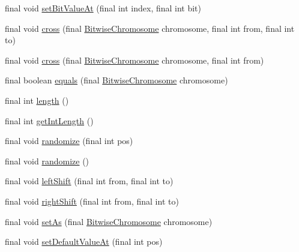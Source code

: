 \begin{DoxyCompactItemize}
\item 
final void \hyperlink{classjenes_1_1chromosome_1_1_bitwise_chromosome_a2e746b511933914d4be452573ac5ab7c}{set\-Bit\-Value\-At} (final int index, final int bit)
\item 
final void \hyperlink{classjenes_1_1chromosome_1_1_bitwise_chromosome_a2d711baa2a74ccb064d33ef73edbd464}{cross} (final \hyperlink{classjenes_1_1chromosome_1_1_bitwise_chromosome}{Bitwise\-Chromosome} chromosome, final int from, final int to)
\item 
final void \hyperlink{classjenes_1_1chromosome_1_1_bitwise_chromosome_a933b1991999fa3b586c1739744751725}{cross} (final \hyperlink{classjenes_1_1chromosome_1_1_bitwise_chromosome}{Bitwise\-Chromosome} chromosome, final int from)
\item 
final boolean \hyperlink{classjenes_1_1chromosome_1_1_bitwise_chromosome_a41c9858f7ef05194011d1e227fea3584}{equals} (final \hyperlink{classjenes_1_1chromosome_1_1_bitwise_chromosome}{Bitwise\-Chromosome} chromosome)
\item 
final int \hyperlink{classjenes_1_1chromosome_1_1_bitwise_chromosome_a0da8899c89f8b1f222526acf1d2e8519}{length} ()
\item 
final int \hyperlink{classjenes_1_1chromosome_1_1_bitwise_chromosome_a5878e8d0ace81cfb617f75109c02855d}{get\-Int\-Length} ()
\item 
final void \hyperlink{classjenes_1_1chromosome_1_1_bitwise_chromosome_a1a79d4c9c671d2f735d57d64c59dfdb8}{randomize} (final int pos)
\item 
final void \hyperlink{classjenes_1_1chromosome_1_1_bitwise_chromosome_a8028fde93528b7b51313f6c311b2b640}{randomize} ()
\item 
final void \hyperlink{classjenes_1_1chromosome_1_1_bitwise_chromosome_ab02c791be30c931cae793289185e459f}{left\-Shift} (final int from, final int to)
\item 
final void \hyperlink{classjenes_1_1chromosome_1_1_bitwise_chromosome_afb689c4b268f7954214a9d0e13c6141e}{right\-Shift} (final int from, final int to)
\item 
final void \hyperlink{classjenes_1_1chromosome_1_1_bitwise_chromosome_aa4fbad5a25ae14e9524a6ff0ec2536ca}{set\-As} (final \hyperlink{classjenes_1_1chromosome_1_1_bitwise_chromosome}{Bitwise\-Chromosome} chromosome)
\item 
final void \hyperlink{classjenes_1_1chromosome_1_1_bitwise_chromosome_ae5be5fc21ff47526230a8a13ca945c08}{set\-Default\-Value\-At} (final int pos)
\item 

\end{DoxyCompactItemize}

